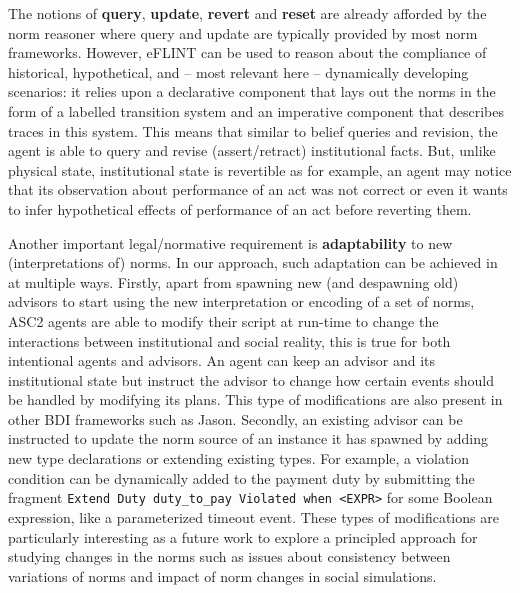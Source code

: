 The notions of \textbf{query}, \textbf{update}, \textbf{revert} and \textbf{reset} are already afforded by the norm reasoner where query and update are typically provided by most norm frameworks. However, eFLINT can be used to reason about the compliance of historical, hypothetical, and -- most relevant here -- dynamically developing scenarios:
%
%
%
it 
relies upon a declarative component that lays out the norms in the form of a labelled transition system and an imperative component that describes traces in this system. This means that similar to belief queries and revision, the agent is able to query and revise (assert/retract) institutional facts. But, unlike physical state, institutional state is revertible as for example, an agent may notice that its observation about performance of an act was not correct or even it wants to infer hypothetical effects of performance of an act before reverting them.


Another important legal/normative requirement is \textbf{adaptability} to new (interpretations of) norms.
%
In our approach, such adaptation can be achieved in at multiple ways.
%
Firstly, apart from spawning new (and despawning old) advisors to start using the new interpretation or encoding of a set of norms, ASC2 agents are able to modify their script at run-time to change the interactions between institutional and social reality, this is true for both intentional agents and advisors. An agent can keep an advisor and its institutional state but instruct the advisor to change how certain events should be handled by modifying its plans. This type of modifications are also present in other BDI frameworks such as Jason.
%
Secondly, an existing advisor can be instructed to update the norm source of an instance it has spawned by adding new type declarations or extending existing types. For example, a violation condition can be dynamically added to the payment duty by submitting the fragment \texttt{Extend Duty duty_to_pay Violated when <EXPR>} for some Boolean expression, like a parameterized timeout event. These types of modifications are particularly interesting as a future work to explore a principled approach for studying changes in the norms such as issues about consistency between variations of norms and impact of norm changes in social simulations.
%
%



